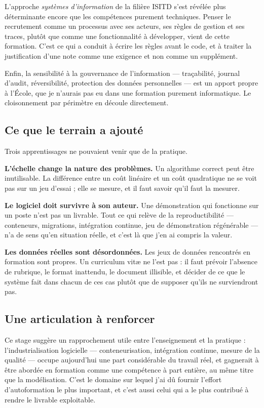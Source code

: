 \documentclass[12pt,a4paper]{report}
\begin{document}
L'approche \emph{systèmes d'information} de la filière ISITD s'est révélée
plus déterminante encore que les compétences purement techniques. Penser le
recrutement comme un processus avec ses acteurs, ses règles de gestion et ses
traces, plutôt que comme une fonctionnalité à développer, vient de cette
formation. C'est ce qui a conduit à écrire les règles avant le code, et à
traiter la justification d'une note comme une exigence et non comme un
supplément.

Enfin, la sensibilité à la gouvernance de l'information --- traçabilité,
journal d'audit, réversibilité, protection des données personnelles --- est un
apport propre à l'École, que je n'aurais pas eu dans une formation purement
informatique. Le cloisonnement par périmètre en découle directement.

\subsection{Ce que le terrain a ajouté}

Trois apprentissages ne pouvaient venir que de la pratique.

\textbf{L'échelle change la nature des problèmes.} Un algorithme correct peut
être inutilisable. La différence entre un coût linéaire et un coût quadratique
ne se voit pas sur un jeu d'essai ; elle se mesure, et il faut savoir qu'il
faut la mesurer.

\textbf{Le logiciel doit survivre à son auteur.} Une démonstration qui
fonctionne sur un poste n'est pas un livrable. Tout ce qui relève de la
reproductibilité --- conteneurs, migrations, intégration continue, jeu de
démonstration régénérable --- n'a de sens qu'en situation réelle, et c'est là
que j'en ai compris la valeur.

\textbf{Les données réelles sont désordonnées.} Les jeux de données
rencontrés en formation sont propres. Un curriculum vitæ ne l'est pas : il
faut prévoir l'absence de rubrique, le format inattendu, le document
illisible, et décider de ce que le système fait dans chacun de ces cas plutôt
que de supposer qu'ils ne surviendront pas.

\subsection{Une articulation à renforcer}

Ce stage suggère un rapprochement utile entre l'enseignement et la pratique :
l'industrialisation logicielle --- conteneurisation, intégration continue,
mesure de la qualité --- occupe aujourd'hui une part considérable du travail
réel, et gagnerait à être abordée en formation comme une compétence à part
entière, au même titre que la modélisation. C'est le domaine sur lequel j'ai
dû fournir l'effort d'autoformation le plus important, et c'est aussi celui
qui a le plus contribué à rendre le livrable exploitable.
\end{document}
